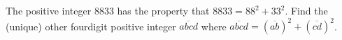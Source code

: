 The positive integer $8833$ has the property that $8833=88^{2}+33^{2}$. Find the (unique) other fourdigit positive integer $\overline{abcd}$ where $\overline{abcd}=(\overline{ab})^{2}+(\overline{cd})^{2}$.